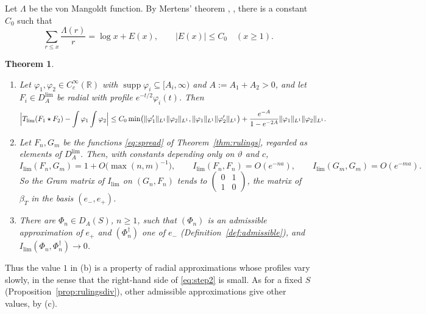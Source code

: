 \documentclass[11pt]{amsart}
\newtheorem{theorem}{Theorem}[section]
\theoremstyle{definition}
\theoremstyle{remark}
\newcommand{\R}{\mathbb R}
\newcommand{\supp}{\operatorname{supp}}
\newcommand{\DA}{D_A}
\begin{document}
Let $\Lambda$ be the von Mangoldt function.  By Mertens' theorem
\cite{Mertens}, \cite[Theorem~2.7]{MontgomeryVaughan},
there is a constant $C_0$ such that
\begin{equation}\label{eq:mertenssum}
\sum_{r\le x}\frac{\Lambda(r)}{r}=\log x+E(x),\qquad|E(x)|\le C_0\quad(x\ge1).
\end{equation}

\begin{theorem}\label{thm:mertens}
\begin{enumerate}
\item[(a)] Let $\varphi_1,\varphi_2\in C_c^{\infty}(\R)$ with
$\supp\varphi_i\subseteq[A_i,\infty)$ and $A:=A_1+A_2>0$, and let
$F_i\in\DA^{\lim}$ be radial with profile $e^{-t/2}\varphi_i(t)$.  Then
\begin{equation}\label{eq:step2}
\Bigl|T_{\lim}(F_1\star F_2)-\int\varphi_1\int\varphi_2\Bigr|
\le C_0\min\bigl(\lVert\varphi_1'\rVert_{L^1}\lVert\varphi_2\rVert_{L^1},
\lVert\varphi_1\rVert_{L^1}\lVert\varphi_2'\rVert_{L^1}\bigr)
+\frac{e^{-A}}{1-e^{-2A}}\lVert\varphi_1\rVert_{L^1}\lVert\varphi_2\rVert_{L^1}.
\end{equation}
\item[(b)] Let $F_n,G_m$ be the functions \eqref{eq:spread} of
Theorem~\ref{thm:rulings}, regarded as elements of $\DA^{\lim}$.  Then, with constants depending only on $\vartheta$ and $c$,
\begin{equation}\label{eq:mertenslimit}
I_{\lim}(F_n,G_m)=1+O\bigl(\max(n,m)^{-1}\bigr),\qquad
I_{\lim}(F_n,F_n)=O(e^{-na}),\qquad I_{\lim}(G_m,G_m)=O(e^{-ma}).
\end{equation}
So the Gram matrix of $I_{\lim}$ on $(G_n,F_n)$ tends to
$\left(\begin{smallmatrix}0&1\\1&0\end{smallmatrix}\right)$, the matrix of
$\beta_T$ in the basis $(e_-,e_+)$.
\item[(c)] There are $\Phi_n\in\DA(S)$, $n\ge1$, such that $(\Phi_n)$ is an
admissible approximation of $e_+$ and $(\Phi_n^{\dagger})$ one of $e_-$
(Definition~\ref{def:admissible}), and $I_{\lim}(\Phi_n,\Phi_n^{\dagger})\to0$.
\end{enumerate}
\end{theorem}

Thus the value $1$ in (b) is a property of radial approximations whose
profiles vary slowly, in the sense that the right-hand side of
\eqref{eq:step2} is small.  As for a fixed $S$
(Proposition~\ref{prop:rulingsdiv}), other admissible approximations give
other values, by (c).
\end{document}
